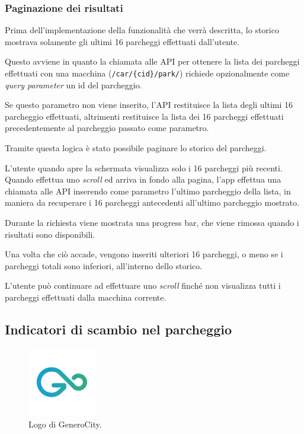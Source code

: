 \subsubsection{Paginazione dei risultati}

Prima dell'implementazione della funzionalità che verrà descritta, lo storico mostrava solamente gli ultimi 16 parcheggi effettuati dall'utente.

Questo avviene in quanto la chiamata alle API per ottenere la lista dei parcheggi effettuati con una macchina (\texttt{/car/\{cid\}/park/}) richiede opzionalmente come \emph{query parameter} un id del parcheggio.

Se questo parametro non viene inserito, l'API restituisce la lista degli ultimi 16 parcheggio effettuati, altrimenti restituisce la lista dei 16 parcheggi effettuati precedentemente al parcheggio passato come parametro.

Tramite questa logica è stato possibile paginare lo storico del parcheggi.

L'utente quando apre la schermata visualizza solo i 16 parcheggi più recenti. Quando effettua uno \emph{scroll} ed arriva in fondo alla pagina, l'app effettua una chiamata alle API inserendo come parametro l'ultimo parcheggio della lista, in maniera da recuperare i 16 parcheggi antecedenti all'ultimo parcheggio mostrato.

Durante la richiesta viene mostrata una progress bar, che viene rimossa quando i risultati sono disponibili.

Una volta che ciò accade, vengono inseriti ulteriori 16 parcheggi, o meno se i parcheggi totali sono inferiori, all'interno dello storico.

L'utente può continuare ad effettuare uno \emph{scroll} finché non visualizza tutti i parcheggi effettuati dalla macchina corrente.

\hypertarget{indicatori-di-scambio-nel-parcheggio}{%
\subsection{Indicatori di scambio nel parcheggio}\label{indicatori-di-scambio-nel-parcheggio}}

\begin{figure}[H]
\centering
\includegraphics[width=3cm]{images/gc-logo.png}
\caption{Logo di GeneroCity.}
\label{gc-logo}
\end{figure}

